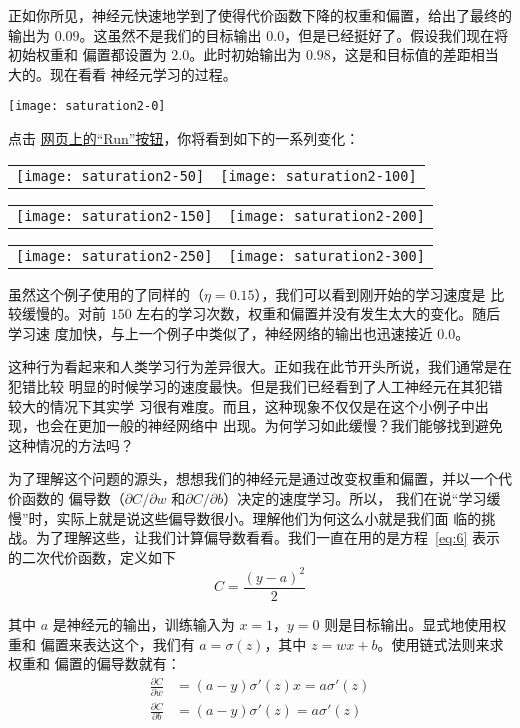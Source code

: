 正如你所见，神经元快速地学到了使得代价函数下降的权重和偏置，给出了最终的输出为
$0.09$。这虽然不是我们的目标输出 $0.0$，但是已经挺好了。假设我们现在将初始权重和
偏置都设置为 $2.0$。此时初始输出为 $0.98$，这是和目标值的差距相当大的。现在看看
神经元学习的过程。
\begin{center}
  \texttt{[image: saturation2-0]}
\end{center}
点击%
\href{http://neuralnetworksanddeeplearning.com/chap3.html#the_cross-entropy_cost_function}{
  网页上的“Run”按钮}，你将看到如下的一系列变化：
  \begin{center}
    \begin{tabular}{ll}
      \texttt{[image: saturation2-50]} & \texttt{[image: saturation2-100]}\\
    \end{tabular}
    \begin{tabular}{ll}
      \texttt{[image: saturation2-150]} & \texttt{[image: saturation2-200]}\\
    \end{tabular}
    \begin{tabular}{ll}
      \texttt{[image: saturation2-250]} & \texttt{[image: saturation2-300]}
    \end{tabular}
  \end{center}

虽然这个例子使用的了同样的\learningrate{}（$\eta=0.15$），我们可以看到刚开始的学习速度是
比较缓慢的。对前 $150$ 左右的学习次数，权重和偏置并没有发生太大的变化。随后学习速
度加快，与上一个例子中类似了，神经网络的输出也迅速接近 $0.0$。

这种行为看起来和人类学习行为差异很大。正如我在此节开头所说，我们通常是在犯错比较
明显的时候学习的速度最快。但是我们已经看到了人工神经元在其犯错较大的情况下其实学
习很有难度。而且，这种现象不仅仅是在这个小例子中出现，也会在更加一般的神经网络中
出现。为何学习如此缓慢？我们能够找到避免这种情况的方法吗？

为了理解这个问题的源头，想想我们的神经元是通过改变权重和偏置，并以一个代价函数的
偏导数（$\partial C/\partial w$ 和$\partial C/\partial b$）决定的速度学习。所以，
我们在说“学习缓慢”时，实际上就是说这些偏导数很小。理解他们为何这么小就是我们面
临的挑战。为了理解这些，让我们计算偏导数看看。我们一直在用的是方程~\eqref{eq:6}
表示的二次代价函数，定义如下
\begin{equation}
  C = \frac{(y-a)^2}{2}
\label{eq:54}\tag{54}
\end{equation}

其中 $a$ 是神经元的输出，训练输入为 $x=1$，$y=0$ 则是目标输出。显式地使用权重和
偏置来表达这个，我们有 $a = \sigma(z)$，其中 $z = wx+b$。使用链式法则来求权重和
偏置的偏导数就有：
\begin{align}
  \frac{\partial C}{\partial w} &= (a-y)\sigma'(z) x = a \sigma'(z)\label{eq:55}\tag{55}\\
  \frac{\partial C}{\partial b} &= (a-y)\sigma'(z) = a \sigma'(z)\label{eq:56}\tag{56}
\end{align}

